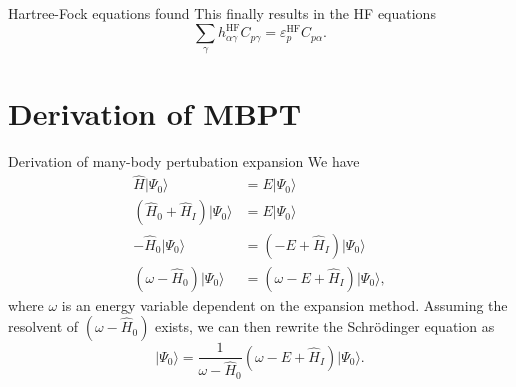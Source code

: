 \documentclass[UKenglish,aspectratio=169]{beamer}
\begin{document}
\begin{frame}{Hartree-Fock equations found}
    This finally results in the HF equations
    \begin{equation}
        \sum_{\gamma} h_{\alpha\gamma}^\mathrm{HF} C_{p \gamma} =
        \varepsilon_p^\mathrm{HF} C_{p \alpha}.
    \end{equation}
\end{frame}

\section{Derivation of MBPT}
\begin{frame}{Derivation of many-body pertubation expansion}
    We have
    \begin{align}
        \hat{H} \lvert \Psi_0 \rangle &= E \lvert \Psi_0 \rangle \\
        \left( \hat{H}_0 + \hat{H}_I \right) \lvert \Psi_0 \rangle &= E \lvert \Psi_0 \rangle \\
        -\hat{H}_0 \lvert \Psi_0 \rangle &= \left( - E + \hat{H}_I \right) \lvert \Psi_0 \rangle \\
        \left( \omega - \hat{H}_0 \right) \lvert \Psi_0 \rangle &= \left(\omega - E + \hat{H}_I \right) \lvert \Psi_0 \rangle,
    \end{align}
    where $\omega$ is an energy variable dependent on the expansion method.
    Assuming the resolvent of $\left( \omega - \hat{H}_0 \right)$ exists, we can then rewrite the Schrödinger equation as
    \begin{equation}
        \lvert \Psi_0 \rangle = \frac{1}{\omega - \hat{H}_0} \left( \omega - E + \hat{H}_I \right) \lvert \Psi_0 \rangle.
    \end{equation}
\end{frame}
\end{document}
